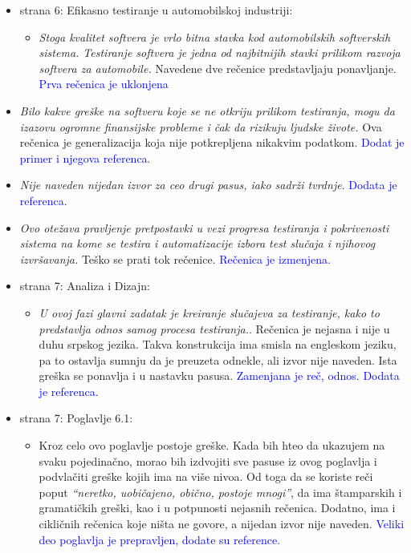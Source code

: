 \documentclass[a4paper]{report}
\newcommand{\odgovor}[1]{\textcolor{blue}{#1}}
\begin{document}
\begin{itemize}
\item strana 6: Efikasno testiranje u automobilskoj industriji:
  \begin{itemize}
\item {\em{Stoga kvalitet softvera je vrlo bitna stavka kod automobilskih softverskih sistema. Testiranje softvera je jedna od najbitnijih stavki prilikom razvoja softvera za automobile.}} Navedene dve rečenice predstavljaju ponavljanje. \odgovor{Prva rečenica je uklonjena} 
  \end{itemize}
\item {\em{ Bilo kakve greške na softveru koje se
ne otkriju prilikom testiranja, mogu da izazovu ogromne finansijske probleme i čak da rizikuju ljudske živote.}} Ova rečenica je generalizacija koja nije potkrepljena nikakvim podatkom. \odgovor{Dodat je primer i njegova referenca.}
\item {\em{Nije naveden nijedan izvor za ceo drugi pasus, iako sadrži tvrdnje}}. \odgovor{Dodata je referenca.}
  \item {\em{Ovo otežava pravljenje pretpostavki u vezi progresa testiranja i pokrivenosti sistema na kome se testira i automatizacije izbora test slučaja i njihovog izvršavanja.}} Teško se prati tok rečenice. \odgovor{Rečenica je izmenjena.}
\end{itemize}

\begin{itemize}
\item strana 7: Analiza i Dizajn:
  \begin{itemize}
  \item {\em{U ovoj fazi glavni zadatak je kreiranje slučajeva za testiranje, kako to predstavlja odnos samog procesa testiranja.}}. Rečenica je nejasna i nije u duhu srpskog jezika. Takva konstrukcija ima smisla na engleskom jeziku, pa to ostavlja sumnju da je preuzeta odnekle, ali izvor nije naveden. Ista greška se ponavlja i u nastavku pasusa. \odgovor{Zamenjana je reč, odnos. Dodata je referenca.}
  \end{itemize}
\end{itemize}


\begin{itemize}
\item strana 7: Poglavlje 6.1:
  \begin{itemize}
  \item Kroz celo ovo poglavlje postoje greške. Kada bih hteo da ukazujem na svaku pojedinačno, morao bih izdvojiti sve pasuse iz ovog poglavlja i podvlačiti greške kojih ima na više nivoa. Od toga da se koriste reči poput {\em{``neretko, uobičajeno, obično, postoje mnogi''}}, da ima štamparskih i gramatičkih greški, kao i u potpunosti nejasnih rečenica. Dodatno, ima i cikličnih rečenica koje ništa ne govore, a nijedan izvor nije naveden. \odgovor{Veliki deo poglavlja je prepravljen, dodate su reference.}
  \end{itemize}
\end{itemize}
\end{document}
